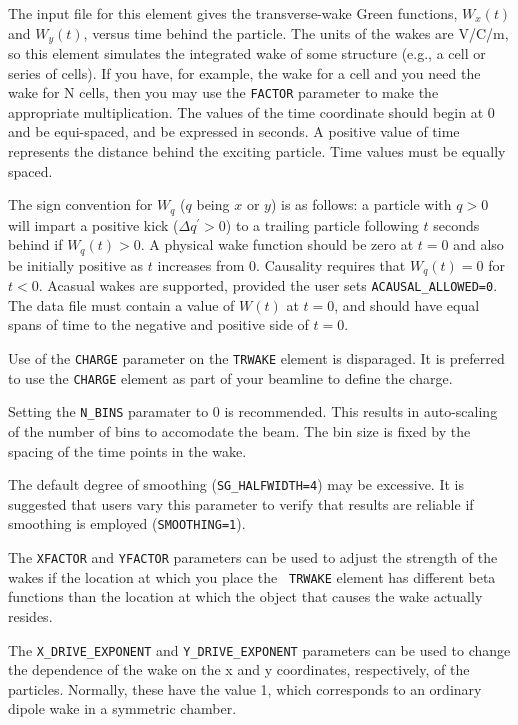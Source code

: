 The input file for this element gives the transverse-wake Green
functions, $W_x(t)$ and $W_y(t)$, versus time behind the particle. The
units of the wakes are V/C/m, so this element simulates the integrated
wake of some structure (e.g., a cell or series of cells).  If you
have, for example, the wake for a cell and you need the wake for N
cells, then you may use the {\tt FACTOR} parameter to make the
appropriate multiplication.  The values of the time coordinate should
begin at 0 and be equi-spaced, and be expressed in seconds.  A positive value of time represents
the distance behind the exciting particle.   Time values must be equally
spaced.

The sign convention for $W_q$ ($q$ being $x$ or $y$) is as follows: a
particle with $q>0$ will impart a positive kick ($\Delta q^\prime >
0$) to a trailing particle following $t$ seconds behind if $W_q(t)>0$.
A physical wake function should be zero at $t=0$ and also be initially
positive as $t$ increases from 0.
Causality requires that $W_q(t)=0$ for $t<0$. Acasual wakes are supported, 
provided the user sets \verb|ACAUSAL_ALLOWED=0|. The data file must contain
a value of $W(t)$ at $t=0$, and should have equal spans of time to the
negative and positive side of $t=0$.

Use of the {\tt CHARGE} parameter on the {\tt TRWAKE} element is
disparaged.  It is preferred to use the {\tt CHARGE} element as part
of your beamline to define the charge.  

Setting the {\tt N\_BINS} paramater to 0 is recommended.  This results
in auto-scaling of the number of bins to accomodate the beam.  The bin
size is fixed by the spacing of the time points in the wake.

The default degree of smoothing ({\tt SG\_HALFWIDTH=4}) may be excessive.
It is suggested that users vary this parameter to verify that results
are reliable if smoothing is employed ({\tt SMOOTHING=1}).

The {\tt XFACTOR} and {\tt YFACTOR} parameters can be used to adjust
the strength of the wakes if the location at which you place the {\tt
TRWAKE} element has different beta functions than the location at
which the object that causes the wake actually resides.  

The {\tt X\_DRIVE\_EXPONENT} and {\tt Y\_DRIVE\_EXPONENT} parameters can be used to change the
dependence of the wake on the x and y coordinates, respectively, of the particles.  
Normally, these have the value 1, which corresponds to 
an ordinary dipole wake in a symmetric chamber.  

